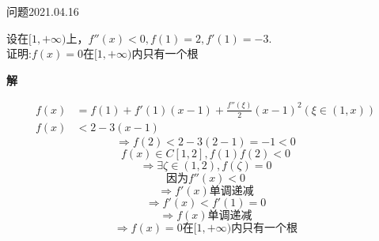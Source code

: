 	\begin{mybox}{问题2021.04.16}
	
	\qquad 设在$[1,+\infty)$上，$f''(x)<0,f(1)=2,f'(1)=-3$.\\
	证明:$f(x)=0$在$[1,+\infty)$内只有一个根
\end{mybox}
\noindent
\textbf{解}

\begin{align*}
	f(x)&=f(1)+f'(1)(x-1)+\frac{f''(\xi)}{2}(x-1)^2(\xi\in(1,x))\\
	f(x)&<2-3(x-1)
\end{align*}
$$\Rightarrow f(2)<2-3(2-1)=-1<0$$
$$f(x)\in C[1,2],f(1)f(2)<0$$
$$\Rightarrow \exists \zeta \in(1,2),f(\zeta)=0$$
$$\text{因为}f''(x)<0$$
$$\Rightarrow f'(x)\text{单调递减}$$
$$\Rightarrow f'(x)<f'(1)=0$$
$$\Rightarrow f(x)\text{单调递减}$$
$$\Rightarrow f(x)=0\text{在}[1,+\infty)\text{内只有一个根}$$